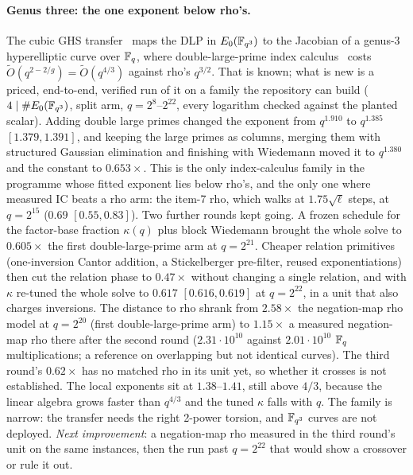 \paragraph{Genus three: the one exponent below rho's.} The cubic GHS
transfer~\cite{ghs2002} maps the DLP in $E_0(\mathbb{F}_{q^3})$ to the Jacobian
of a genus-3 hyperelliptic curve over $\mathbb{F}_q$, where double-large-prime
index calculus~\cite{gtthd2007} costs $\tilde O(q^{2-2/g})=\tilde O(q^{4/3})$
against rho's $q^{3/2}$. That is known; what is new is a priced,
end-to-end, verified run of it on a family the repository can build
($4\mid\#E_0(\mathbb{F}_{q^3})$, split arm, $q=2^{8}$--$2^{22}$, every logarithm checked
against the planted scalar). Adding double large primes changed the
exponent from $q^{1.910}$ to $q^{1.385}$ $[1.379,1.391]$, and keeping the large
primes as columns, merging them with structured Gaussian elimination and
finishing with Wiedemann moved it to $q^{1.380}$ and the constant to
$0.653\times$. This is the only index-calculus family in the programme whose
fitted exponent lies below rho's, and the only one where measured
IC beats a rho arm: the item-7 rho, which walks at $1.75\sqrt\ell$ steps,
at $q=2^{15}$ ($0.69$ $[0.55,0.83]$). Two further
rounds kept going. A frozen schedule for the factor-base fraction $\kappa(q)$
plus block Wiedemann brought the whole solve to $0.605\times$ the first
double-large-prime arm at $q=2^{21}$. Cheaper relation primitives
(one-inversion Cantor addition, a Stickelberger pre-filter, reused
exponentiations) then cut the relation phase to $0.47\times$ without
changing a single relation, and with $\kappa$ re-tuned the whole solve to
$0.617$ $[0.616,0.619]$ at $q=2^{22}$, in a unit that also charges
inversions. The distance to rho shrank from $2.58\times$ the negation-map
rho model at $q=2^{20}$ (first double-large-prime arm) to $1.15\times$ a
measured negation-map rho there after the second round ($2.31\cdot10^{10}$
against $2.01\cdot10^{10}$ $\mathbb{F}_q$ multiplications; a reference on
overlapping but not identical curves). The third round's $0.62\times$
has no matched rho in its unit yet, so whether it crosses is not
established. The local exponents sit at $1.38$--$1.41$, still above $4/3$,
because the linear algebra grows faster than $q^{4/3}$ and the tuned
$\kappa$ falls with $q$. The family is narrow: the transfer needs the
right 2-power torsion, and $\mathbb{F}_{q^3}$ curves are not deployed.
\emph{Next improvement}: a negation-map rho measured in the third round's
unit on the same instances, then the run past $q=2^{22}$ that would show a
crossover or rule it out.

